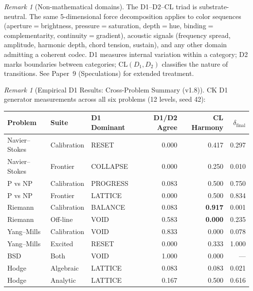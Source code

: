 \documentclass[12pt, openany]{book}
\theoremstyle{remark}
\newtheorem{remark}[theorem]{Remark}
\begin{document}
\begin{remark}[Non-mathematical domains]
The D1--D2--CL triad is substrate-neutral.  The same 5-dimensional force decomposition
applies to color sequences (aperture$=$brightness, pressure$=$saturation, depth$=$hue,
binding$=$complementarity, continuity$=$gradient), acoustic signals (frequency spread,
amplitude, harmonic depth, chord tension, sustain), and any other domain admitting a
coherent codec.  D1 measures internal variation within a category; D2 marks boundaries
between categories; CL$(D_1, D_2)$ classifies the nature of transitions.  See Paper~9
(Speculations) for extended treatment.
\end{remark}

\begin{remark}[Empirical D1 Results: Cross-Problem Summary (v1.8)]
CK D1 generator measurements across all six problems (12 levels, seed 42):
\begin{center}
\begin{tabular}{lllrrr}
\toprule
\textbf{Problem} & \textbf{Suite} & \textbf{D1 Dominant} & \textbf{D1/D2 Agree} & \textbf{CL Harmony} & $\delta_{\mathrm{final}}$ \\
\midrule
Navier--Stokes & Calibration & RESET & 0.000 & 0.417 & 0.297 \\
Navier--Stokes & Frontier & COLLAPSE & 0.000 & 0.250 & 0.010 \\
P vs NP & Calibration & PROGRESS & 0.083 & 0.500 & 0.750 \\
P vs NP & Frontier & LATTICE & 0.000 & 0.500 & 0.834 \\
Riemann & Calibration & BALANCE & 0.083 & \textbf{0.917} & 0.001 \\
Riemann & Off-line & VOID & 0.583 & \textbf{0.000} & 0.235 \\
Yang--Mills & Calibration & VOID & 0.833 & 0.000 & 0.078 \\
Yang--Mills & Excited & RESET & 0.000 & 0.333 & 1.000 \\
BSD & Both & VOID & 1.000 & 0.000 & --- \\
Hodge & Algebraic & LATTICE & 0.083 & 0.083 & 0.021 \\
Hodge & Analytic & LATTICE & 0.167 & 0.500 & 0.616 \\
\bottomrule
\end{tabular}
\end{center}


\end{remark}
\end{document}
